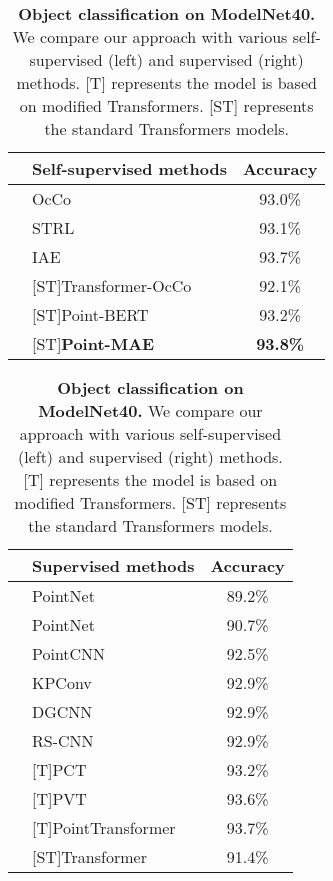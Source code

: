 \documentclass[runningheads]{llncs}
\begin{document}
\begin{table}
\begin{center}
\vspace{-3mm}
\caption{{\bf Object classification on ModelNet40.} We compare our approach with various self-supervised (left) and supervised (right) methods. [T] represents the model is based on modified Transformers. [ST] represents the standard Transformers models.}

\label{tb:1}
\begin{minipage}{0.45\textwidth}
\begin{tabular}{clc}
\hline
&Self-supervised methods   & Accuracy\\
\hline
&OcCo~\cite{ptocco}  & 93.0\% \\
&STRL~\cite{ptstrl}   & 93.1\% \\
&IAE~\cite{ptiae} & 93.7\% \\
&[ST]Transformer-OcCo~\cite{pointbert} & 92.1\% \\
&[ST]Point-BERT~\cite{pointbert} & 93.2\% \\
&[ST]{\bf Point-MAE}& {\bf 93.8\%} \\
\hline

\end{tabular}
\end{minipage}
\begin{minipage}{0.45\textwidth}
\begin{tabular}{clc}
\hline
& Supervised methods &    Accuracy\\
\hline
 &PointNet~\cite{pointnet}&  89.2\% \\
 &PointNet~\cite{pointnet++}&   90.7\% \\

 &PointCNN~\cite{ptptcnn}&  92.5\% \\
 &KPConv~\cite{ptkpconv}&  92.9\% \\
&DGCNN~\cite{ptptcnn}& 92.9\% \\
 &RS-CNN~\cite{ptrscnn}& 92.9\% \\
 &[T]PCT~\cite{ptpct} &  93.2\% \\
 &[T]PVT~\cite{ptpvt} &  93.6\% \\
 &[T]PointTransformer~\cite{ptpt}& 93.7\% \\
 &[ST]Transformer~\cite{pointbert}& 91.4\%\\
\hline
\end{tabular}
\end{minipage}
\end{center}
\end{table}
\end{document}
